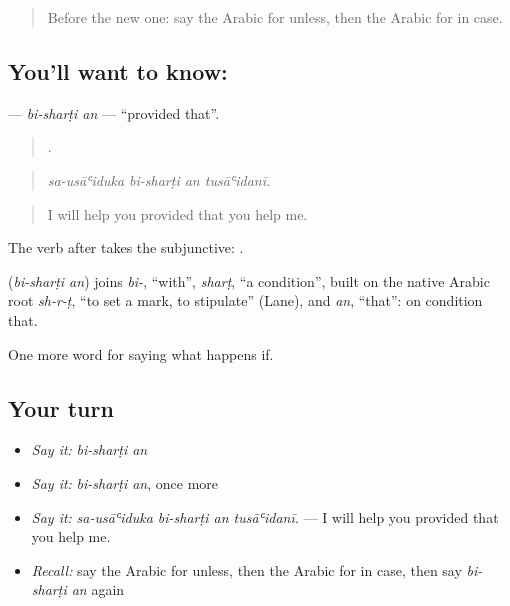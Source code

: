 \label{lesson:AR-C399-bi-sharti-an}



\begin{quote}
Before the new one: say the Arabic for unless, then the Arabic for in case.
\end{quote}

\subsection*{You'll want to know:  }
\textbf{ } — \emph{bi-sharṭi an} — \textquotedblleft{}provided that\textquotedblright{}.

\begin{quote}
   .
\end{quote}

\begin{quote}
\emph{sa-usāʿiduka bi-sharṭi an tusāʿidanī.}
\end{quote}

\begin{quote}
I will help you provided that you help me.
\end{quote}

The verb after  takes the subjunctive:  .

\begin{cousinweb}
\textbf{ } (\emph{bi-sharṭi an}) joins \emph{bi-}, \textquotedblleft{}with\textquotedblright{}, \emph{sharṭ}, \textquotedblleft{}a condition\textquotedblright{}, built on the native Arabic root \emph{sh-r-ṭ}, \textquotedblleft{}to set a mark, to stipulate\textquotedblright{} (Lane), and \emph{an}, \textquotedblleft{}that\textquotedblright{}: on condition that.
\end{cousinweb}

\begin{grammarlens}[title={What you've built}]
One more word for saying what happens if.
\end{grammarlens}

\subsection*{Your turn}
\begin{itemize}
\raggedright
  \item \emph{Say it:} \emph{bi-sharṭi an}
  \item \emph{Say it:} \emph{bi-sharṭi an}, once more
  \item \emph{Say it:} \emph{sa-usāʿiduka bi-sharṭi an tusāʿidanī.} — I will help you provided that you help me.
  \item \emph{Recall:} say the Arabic for unless, then the Arabic for in case, then say \emph{bi-sharṭi an} again
\end{itemize}

